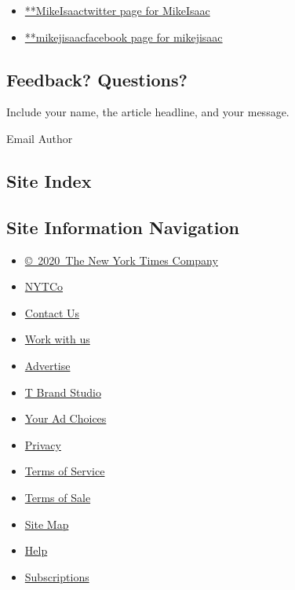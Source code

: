 \begin{itemize}
\tightlist
\item
  \href{https://twitter.com/MikeIsaac}{**MikeIsaactwitter page for
  MikeIsaac}
\item
  \href{https://www.facebookcorewwwi.onion/mikejisaac}{**mikejisaacfacebook
  page for mikejisaac}
\end{itemize}

\hypertarget{feedback-questions}{%
\subsection{Feedback? Questions?}\label{feedback-questions}}

Include your name, the article headline, and your message.

Email Author

\hypertarget{site-index}{%
\subsection{Site Index}\label{site-index}}

\hypertarget{site-information-navigation}{%
\subsection{Site Information
Navigation}\label{site-information-navigation}}

\begin{itemize}
\tightlist
\item
  \href{https://help.nytimes3xbfgragh.onion/hc/en-us/articles/115014792127-Copyright-notice}{©~2020~The
  New York Times Company}
\end{itemize}

\begin{itemize}
\tightlist
\item
  \href{https://www.nytco.com/}{NYTCo}
\item
  \href{https://help.nytimes3xbfgragh.onion/hc/en-us/articles/115015385887-Contact-Us}{Contact
  Us}
\item
  \href{https://www.nytco.com/careers/}{Work with us}
\item
  \href{https://nytmediakit.com/}{Advertise}
\item
  \href{http://www.tbrandstudio.com/}{T Brand Studio}
\item
  \href{https://www.nytimes3xbfgragh.onion/privacy/cookie-policy\#how-do-i-manage-trackers}{Your
  Ad Choices}
\item
  \href{https://www.nytimes3xbfgragh.onion/privacy}{Privacy}
\item
  \href{https://help.nytimes3xbfgragh.onion/hc/en-us/articles/115014893428-Terms-of-service}{Terms
  of Service}
\item
  \href{https://help.nytimes3xbfgragh.onion/hc/en-us/articles/115014893968-Terms-of-sale}{Terms
  of Sale}
\item
  \href{https://spiderbites.nytimes3xbfgragh.onion}{Site Map}
\item
  \href{https://help.nytimes3xbfgragh.onion/hc/en-us}{Help}
\item
  \href{https://www.nytimes3xbfgragh.onion/subscription?campaignId=37WXW}{Subscriptions}
\end{itemize}
